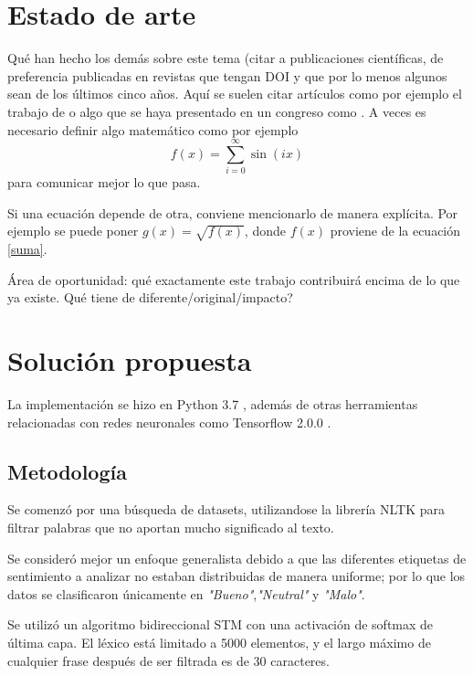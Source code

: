\documentclass[a4]{sciposter}
\begin{document}
\begin{multicols}{2}
\begin{figure}
\end{figure}

\section{Estado de arte}

Qué han hecho los demás sobre este tema (citar a publicaciones
científicas, de preferencia publicadas en revistas que tengan DOI y
que por lo menos algunos sean de los últimos cinco años. Aquí se
suelen citar artículos como por ejemplo el trabajo de \citet{elisa} o
algo que se haya presentado en un congreso como \citet{ar}. A veces es
necesario definir algo matemático como por ejemplo
\begin{equation}
    f(x) = \sum_{i = 0}^\infty \sin(i x)
    \label{suma}
\end{equation}
para comunicar mejor lo que pasa.

Si una ecuación depende de otra, conviene mencionarlo de manera
explícita. Por ejemplo se puede poner $g(x) = \sqrt{f(x)}$, donde
$f(x)$ proviene de la ecuación \eqref{suma}.

Área de oportunidad: qué exactamente este trabajo contribuirá encima
de lo que ya existe.  {\textquestiondown}Qué tiene de
diferente/original/impacto?

\section{Solución propuesta}
La implementación se hizo en Python 3.7 \citep{python}, además de otras herramientas relacionadas con redes neuronales como Tensorflow 2.0.0 \citep{tensorflow}.



\subsection{Metodología}
Se comenzó por una búsqueda de datasets, utilizandose la librería NLTK \citep{nltk} para filtrar palabras que no aportan mucho significado al texto.

Se consideró mejor un enfoque generalista debido a que las diferentes etiquetas de sentimiento a analizar no estaban distribuidas de manera uniforme; por lo que los datos se clasificaron únicamente en \textit{"Bueno"},\textit{"Neutral"} y \textit{"Malo"}.

Se utilizó un algoritmo bidireccional STM con una activación de softmax de última capa. El léxico está limitado a 5000 elementos, y el largo máximo de cualquier frase después de ser filtrada es de 30 caracteres.


\end{multicols}
\end{document}
